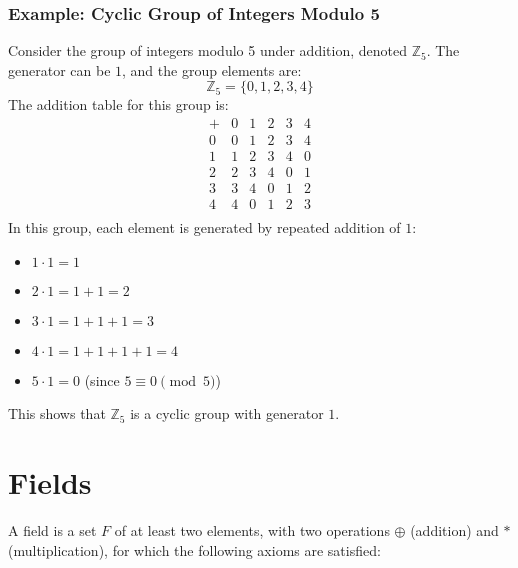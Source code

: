 \documentclass[11pt, letterpaper]{article}
\begin{document}
\subsubsection*{Example: Cyclic Group of Integers Modulo 5}

Consider the group of integers modulo 5 under addition, denoted \( \mathbb{Z}_5 \). The generator can be \( 1 \), and the group elements are:
\[
\mathbb{Z}_5 = \{0, 1, 2, 3, 4\}
\]
The addition table for this group is:
\[
\begin{array}{c|ccccc}
+ & 0 & 1 & 2 & 3 & 4 \\
\hline
0 & 0 & 1 & 2 & 3 & 4 \\
1 & 1 & 2 & 3 & 4 & 0 \\
2 & 2 & 3 & 4 & 0 & 1 \\
3 & 3 & 4 & 0 & 1 & 2 \\
4 & 4 & 0 & 1 & 2 & 3 \\
\end{array}
\]
In this group, each element is generated by repeated addition of \( 1 \):
\begin{itemize}
    \item \( 1 \cdot 1 = 1 \)
    \item \( 2 \cdot 1 = 1 + 1 = 2 \)
    \item \( 3 \cdot 1 = 1 + 1 + 1 = 3 \)
    \item \( 4 \cdot 1 = 1 + 1 + 1 + 1 = 4 \)
    \item \( 5 \cdot 1 = 0 \) (since \( 5 \equiv 0 \pmod{5} \))
\end{itemize}
This shows that \( \mathbb{Z}_5 \) is a cyclic group with generator \( 1 \).

\section{Fields}

A field is a set \( F \) of at least two elements, with two operations \( \oplus \) (addition) and \( \ast \) (multiplication), for which the following axioms are satisfied:
\end{document}
